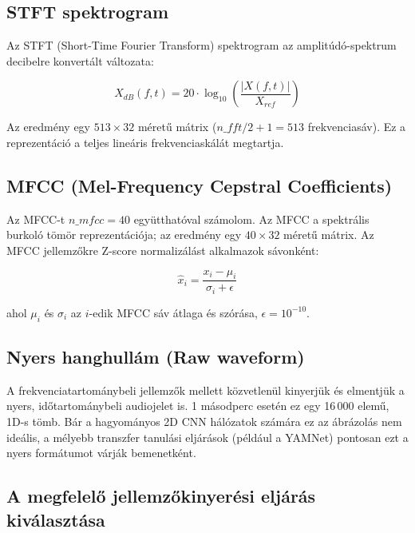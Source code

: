 \subsection{STFT spektrogram}

Az STFT (Short-Time Fourier Transform) spektrogram az amplitúdó-spektrum decibelre konvertált változata:

$$X_{dB}(f,t) = 20 \cdot \log_{10}\left(\frac{|X(f,t)|}{X_{ref}}\right)$$

Az eredmény egy $513 \times 32$ méretű mátrix ($n\_fft/2 + 1 = 513$ frekvenciasáv). Ez a reprezentáció a teljes lineáris frekvenciaskálát megtartja.

\subsection{MFCC (Mel-Frequency Cepstral Coefficients)}

Az MFCC-t $n\_mfcc = 40$ együtthatóval számolom. Az MFCC a spektrális burkoló tömör reprezentációja; az eredmény egy $40 \times 32$ méretű mátrix. Az MFCC jellemzőkre Z-score normalizálást alkalmazok sávonként:

$$\hat{x}_i = \frac{x_i - \mu_i}{\sigma_i + \epsilon}$$

ahol $\mu_i$ és $\sigma_i$ az $i$-edik MFCC sáv átlaga és szórása, $\epsilon = 10^{-10}$.

\subsection{Nyers hanghullám (Raw waveform)}

A frekvenciatartománybeli jellemzők mellett közvetlenül kinyerjük és elmentjük a nyers, időtartománybeli audiojelet is. 1 másodperc esetén ez egy 16\,000 elemű, 1D-s tömb. Bár a hagyományos 2D CNN hálózatok számára ez az ábrázolás nem ideális, a mélyebb transzfer tanulási eljárások (például a YAMNet) pontosan ezt a nyers formátumot várják bemenetként.

\subsection{A megfelelő jellemzőkinyerési eljárás kiválasztása}
\label{subsec:feature_selection}

